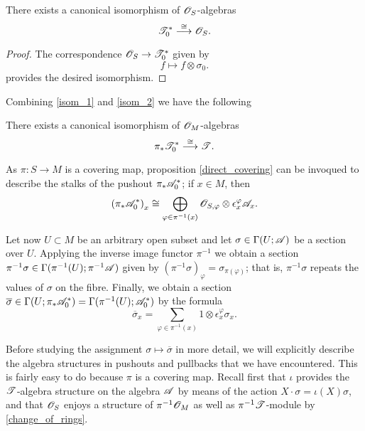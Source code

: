 \begin{proposition}\label{isom_2}
There exists a canonical isomorphism of $\mathscr{O}_S$-algebras
$$\mathscr{T}^*_0\stackrel{\cong}{\longrightarrow}\mathscr{O}_S.$$
\end{proposition}
\begin{proof}
The correspondence $\mathscr{O}_S\to \mathscr{T}^*_0$ given by
$$f\longmapsto f\otimes \sigma_0.$$
provides the desired isomorphism.
\end{proof}

Combining \ref{isom_1} and \ref{isom_2} we have the following

\begin{cor}
There exists a canonical isomorphism of $\mathscr{O}_M$-algebras
$$\pi_*\mathscr{T}^*_0\stackrel{\cong}{\longrightarrow}\mathscr{T}.$$
\end{cor}

As $\pi :S\to M$ is a covering map, proposition \ref{direct_covering} can be invoqued to describe the stalks of the pushout $\pi_*\mathscr{A}^*_0$; if $x\in M$, then
$$\left (\pi_*\mathscr{A}^*_0\right )_x\cong \bigoplus_{\varphi \in \pi^{-1}(x)}\mathscr{O}_{S,\varphi}\otimes \epsilon^{\varphi}_x\mathscr{A}_x.$$

Let now $U\subset M$ be an arbitrary open subset and let $\sigma \in \Gamma (U;\mathscr{A})$ be a section over $U$. Applying the inverse image functor $\pi^{-1}$ we obtain a section $\pi^{-1}\sigma \in \Gamma (\pi^{-1}(U);\pi^{-1}\mathscr{A})$ given by $(\pi^{-1}\sigma )_{\varphi}=\sigma_{\pi (\varphi )}$; that is, $\pi^{-1}\sigma$ repeats the values of $\sigma$ on the fibre. Finally, we obtain a section $\overline{\sigma}\in \Gamma (U;\pi_*\mathscr{A}^*_0)=\Gamma (\pi^{-1}(U);\mathscr{A}^*_0)$ by the formula
\begin{equation}\label{final_isomorphism}
\overline{\sigma}_x=\sum_{\varphi \in \pi^{-1}(x)}1\otimes \epsilon^{\varphi}_x\sigma_x.
\end{equation}

Before studying the assignment $\sigma \mapsto \overline{\sigma}$ in more detail, we will explicitly describe the algebra structures in pushouts and pullbacks that we have encountered. This is fairly easy to do because $\pi$ is a covering map. Recall first that $\iota$ provides the $\mathscr{T}$-algebra structure on the algebra $\mathscr{A}$ by means of the action $X\cdot \sigma =\iota (X)\sigma$, and that $\mathscr{O}_S$ enjoys a structure of $\pi^{-1}\mathscr{O}_M$ as well as $\pi^{-1}\mathscr{T}$-module by \eqref{change_of_rings}.

